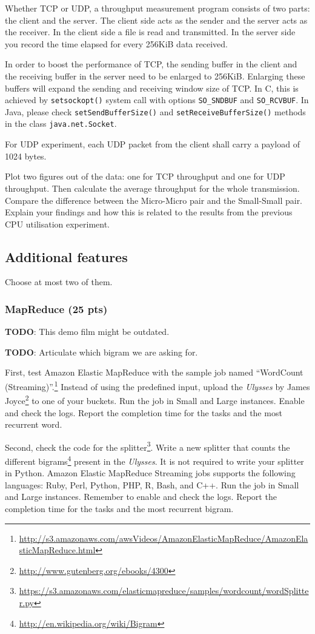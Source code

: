 \documentclass[12pt, a4paper]{article}
\begin{document}
Whether TCP or UDP, a throughput measurement program consists of two parts: the client and the server.
The client side acts as the sender and the server acts as the receiver.
In the client side a file is read and transmitted.
In the server side you record the time elapsed for every 256KiB data received.

In order to boost the performance of TCP, the sending buffer in the client and the receiving buffer in the server need to be enlarged to 256KiB.
Enlarging these buffers will expand the sending and receiving window size of TCP.
In C, this is achieved by \texttt{setsockopt()} system call with options \texttt{SO\_SNDBUF} and \texttt{SO\_RCVBUF}.
In Java, please check \texttt{setSendBufferSize()} and \texttt{setReceiveBufferSize()} methods in the class \texttt{java.net.Socket}.

For UDP experiment, each UDP packet from the client shall carry a payload of 1024 bytes.

Plot two figures out of the data: one for TCP throughput and one for UDP throughput.
Then calculate the average throughput for the whole transmission.
Compare the difference between the Micro-Micro pair and the Small-Small pair.
Explain your findings and how this is related to the results from the previous CPU utilisation experiment.
\subsection{Additional features}
Choose at most two of them.

\subsubsection{MapReduce (25 pts)}

\textbf{TODO}: This demo film might be outdated.

\textbf{TODO}: Articulate which bigram we are asking for.
\vskip 15pt

First, test Amazon Elastic MapReduce with the sample job named ``WordCount (Streaming)''.\footnote{\url{http://s3.amazonaws.com/awsVideos/AmazonElasticMapReduce/AmazonElasticMapReduce.html}}
Instead of using the predefined input, upload the \emph{Ulysses} by James Joyce\footnote{\url{http://www.gutenberg.org/ebooks/4300}} to one of your buckets.
Run the job in Small and Large instances.
Enable and check the logs.
Report the completion time for the tasks and the most recurrent word.

Second, check the code for the splitter\footnote{\url{https://s3.amazonaws.com/elasticmapreduce/samples/wordcount/wordSplitter.py}}.
Write a new splitter that counts the different bigrams\footnote{\url{http://en.wikipedia.org/wiki/Bigram}} present in the \emph{Ulysses}.
It is not required to write your splitter in Python.
Amazon Elastic MapReduce Streaming jobs supports the following languages: Ruby, Perl, Python, PHP, R, Bash, and C++.
Run the job in Small and Large instances.
Remember to enable and check the logs.
Report the completion time for the tasks and the most recurrent bigram.
\end{document}
